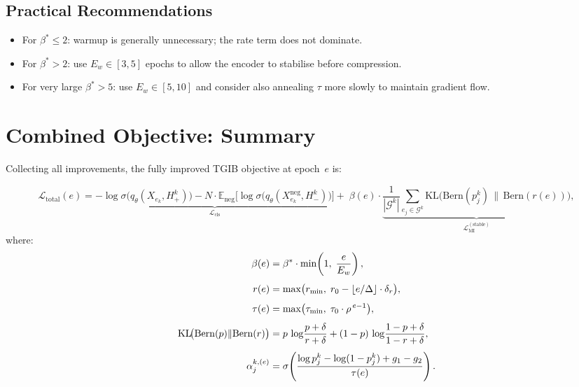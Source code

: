\documentclass[11pt,a4paper]{article}
\newcommand{\G}{\mathcal{G}}
\newcommand{\KL}{\mathrm{KL}}
\newcommand{\Bern}{\mathrm{Bern}}
\newcommand{\E}{\mathbb{E}}
\newcommand{\loss}{\mathcal{L}}
\begin{document}
\subsection{Practical Recommendations}

\begin{itemize}[leftmargin=*,itemsep=2pt]
  \item For $\beta^* \leq 2$: warmup is generally unnecessary; the
        rate term does not dominate.
  \item For $\beta^* > 2$: use $E_w \in [3, 5]$ epochs to allow the
        encoder to stabilise before compression.
  \item For very large $\beta^* > 5$: use $E_w \in [5, 10]$ and
        consider also annealing $\tau$ more slowly to maintain gradient
        flow.
\end{itemize}

\section{Combined Objective: Summary}
\label{sec:combined}

Collecting all improvements, the fully improved TGIB objective at
epoch~$e$ is:

\begin{equation}
\label{eq:final_objective}
\boxed{
\loss_{\text{total}}(e)
  = \underbrace{-\log\sigma\!\big(q_\theta(X_{e_k}, H_+^k)\big)
    - N \cdot \E_{\text{neg}}\!\big[
      \log\sigma\!\big(q_\theta(X_{e_k}^{\text{neg}}, H_-^k)\big)
    \big]}_{\displaystyle\loss_{\text{cls}}}
  + \;\beta(e)
    \cdot \underbrace{\frac{1}{|\G^k|} \sum_{e_j \in \G^k}
      \KL\!\big(\Bern(p_j^k) \,\|\, \Bern(r(e))\big)}_{\displaystyle\loss_{\text{MI}}^{(\text{stable})}},
}
\end{equation}
where:
\begin{align}
\label{eq:components}
\beta(e) &= \beta^* \cdot \min\!\left(1,\; \frac{e}{E_w}\right),
  \notag\\[4pt]
r(e) &= \max\!\big(
  r_{\min},\;
  r_0 - \lfloor e / \Delta \rfloor \cdot \delta_r
\big),
  \notag\\[4pt]
\tau(e) &= \max\!\big(
  \tau_{\min},\;
  \tau_0 \cdot \rho^{\,e-1}
\big),
  \notag\\[4pt]
\KL\!\big(\Bern(p) \| \Bern(r)\big)
  &= p\,\log\!\frac{p + \delta}{r + \delta}
  + (1 - p)\,\log\!\frac{1 - p + \delta}{1 - r + \delta},
  \notag\\[4pt]
\alpha_j^{k,(e)} &= \sigma\!\left(
  \frac{\log p_j^k - \log(1 - p_j^k) + g_1 - g_2}{\tau(e)}
\right).
\end{align}
\end{document}
